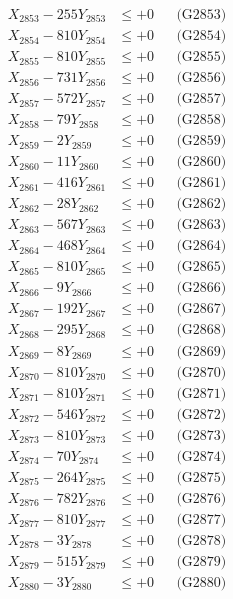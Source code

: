 \documentclass[a4paper,10pt]{article}
\begin{document}
{\begin{align}
X_{2853} - 255Y_{2853} &\leq +0 && \text{(G2853)} \\
X_{2854} - 810Y_{2854} &\leq +0 && \text{(G2854)} \\
X_{2855} - 810Y_{2855} &\leq +0 && \text{(G2855)} \\
X_{2856} - 731Y_{2856} &\leq +0 && \text{(G2856)} \\
X_{2857} - 572Y_{2857} &\leq +0 && \text{(G2857)} \\
X_{2858} - 79Y_{2858} &\leq +0 && \text{(G2858)} \\
X_{2859} - 2Y_{2859} &\leq +0 && \text{(G2859)} \\
X_{2860} - 11Y_{2860} &\leq +0 && \text{(G2860)} \\
\allowbreak
X_{2861} - 416Y_{2861} &\leq +0 && \text{(G2861)} \\
X_{2862} - 28Y_{2862} &\leq +0 && \text{(G2862)} \\
X_{2863} - 567Y_{2863} &\leq +0 && \text{(G2863)} \\
X_{2864} - 468Y_{2864} &\leq +0 && \text{(G2864)} \\
X_{2865} - 810Y_{2865} &\leq +0 && \text{(G2865)} \\
X_{2866} - 9Y_{2866} &\leq +0 && \text{(G2866)} \\
X_{2867} - 192Y_{2867} &\leq +0 && \text{(G2867)} \\
X_{2868} - 295Y_{2868} &\leq +0 && \text{(G2868)} \\
X_{2869} - 8Y_{2869} &\leq +0 && \text{(G2869)} \\
X_{2870} - 810Y_{2870} &\leq +0 && \text{(G2870)} \\
\allowbreak
X_{2871} - 810Y_{2871} &\leq +0 && \text{(G2871)} \\
X_{2872} - 546Y_{2872} &\leq +0 && \text{(G2872)} \\
X_{2873} - 810Y_{2873} &\leq +0 && \text{(G2873)} \\
X_{2874} - 70Y_{2874} &\leq +0 && \text{(G2874)} \\
X_{2875} - 264Y_{2875} &\leq +0 && \text{(G2875)} \\
X_{2876} - 782Y_{2876} &\leq +0 && \text{(G2876)} \\
X_{2877} - 810Y_{2877} &\leq +0 && \text{(G2877)} \\
X_{2878} - 3Y_{2878} &\leq +0 && \text{(G2878)} \\
X_{2879} - 515Y_{2879} &\leq +0 && \text{(G2879)} \\
X_{2880} - 3Y_{2880} &\leq +0 && \text{(G2880)} \\

\end{align}}
\end{document}
